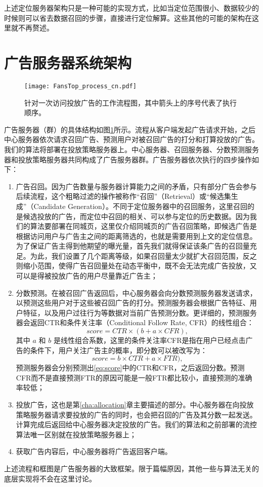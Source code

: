 上述定位服务器架构只是一种可能的实现方式，比如当定位范围很小、数据较少的时候则可以省去数据召回的步骤，直接进行定位解算。这些其他的可能的架构在这里就不再赘述。

\section{广告服务器系统架构} \label{sec:ad}

\begin{figure}[tb]
	\centering
	\texttt{[image: FansTop\_process\_cn.pdf]}
	\caption{针对一次访问投放广告的工作流程图，其中箭头上的序号代表了执行顺序。}
	\label{fig:fssys}
\end{figure}

广告服务器（群）的具体结构如图\ref{fig:fssys}所示。流程从客户端发起广告请求开始，之后中心服务器依次请求召回广告、预测用户对被召回广告的打分和打算投放的广告。我们的算法将部署在投放策略服务器上。中心服务器、召回服务器、分数预测服务器和投放策略服务器共同构成了广告服务器群。广告服务器依次执行的四步操作如下：
\begin{enumerate}
	\item 广告召回。因为广告数量与服务器计算能力之间的矛盾，只有部分广告会参与后续流程，这个粗略过滤的操作被称作“召回”（Retrieval）或“候选集生成”（Candidate Generation）。不同于定位服务器中的召回服务，这里召回的是候选投放的广告，而定位中召回的相关、可以参与定位的历史数据。因为我们的算法要部署在同城页，这里仅介绍同城页的广告召回策略，即候选广告是根据访问用户与广告主之间的距离筛选的，也就是需要用到上文的定位信息。为了保证广告主得到他期望的曝光量，首先我们就得保证该条广告的召回量充足。为此，我们设置了几个距离等级，如果召回量太少就扩大召回范围，反之则缩小范围，使得广告召回量处在动态平衡中，既不会无法完成广告投放，又可以是得被投放广告的用户尽量靠近广告主；
	\item 分数预测。在被召回广告返回后，中心服务器会向分数预测服务器发送请求，以预测这些用户对于这些被召回广告的打分。预测服务器会根据广告特征、用户特征，以及用户过往行为等数据对当前广告预测分数。更详细的，预测服务器会返回CTR和条件关注率（Conditional Follow Rate, CFR）的线性组合：
	\begin{equation}
		score = CTR \times  (b + a \times CFR), \label{eq:score}
	\end{equation}
	其中 $a$ 和 $b$ 是线性组合系数，这里的条件关注率CFR是指在用户已经点击广告的条件下，用户关注广告主的概率，即分数可以被改写为：
	\begin{equation}
	score = b \times CTR + a \times FTR), 
	\end{equation}
	预测服务器会分别预测出\eqref{eq:score}中的CTR和CFR，之后返回分数。预测CFR而不是直接预测FTR的原因可能是一般FTR都比较小，直接预测的准确率较低；
	\item 投放广告，这也是第\ref{cha:allocation}章主要描述的部分。中心服务器在向投放策略服务器请求要投放的广告的同时，也会把召回的广告及其分数一起发送。计算完成后返回给中心服务器决定投放的广告。我们的算法和之前部署的流控算法唯一区别就在投放策略服务器上；
	\item 获取广告内容后，中心服务器将广告返回客户端。
\end{enumerate}

上述流程和框图是广告服务器的大致框架。限于篇幅原因，其他一些与算法无关的底层实现将不会在这里讨论。





